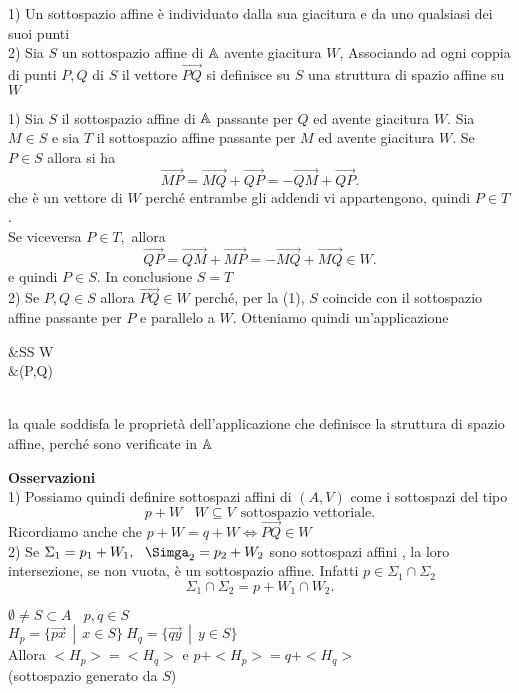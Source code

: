 \documentclass[12px]{article}
\begin{document}
	\newpage
	\begin{prop}
		1) Un sottospazio affine è individuato dalla sua giacitura e da uno qualsiasi dei suoi punti\\
		2) Sia $S$ un sottospazio affine di $\mathbb{A}$ avente giacitura $W$, Associando ad ogni coppia di punti $P,Q$ di $S$ il vettore $\overrightarrow{PQ}$ si definisce su $S$ una struttura di spazio affine su $W$
	\end{prop}
	\begin{dimo}
		1) Sia  $S$ il sottospazio affine di $\mathbb{A}$ passante per $Q$ ed avente giacitura $W$. Sia $M\in S$ e sia $T$ il sottospazio affine passante per $M$ ed avente giacitura $W$. Se $P\in S$ allora si ha
		\[
		 \overrightarrow{MP}=\overrightarrow{MQ}+\overrightarrow{QP} = - \overrightarrow{QM} + \overrightarrow{QP}
		.\] 
		che è un vettore di $W$ perché entrambe gli addendi vi appartengono, quindi $P\in T$.\\
		Se viceversa $P\in T,$ allora
		\[
		\overrightarrow{QP} = \overrightarrow{QM} + \overrightarrow{MP} = - \overrightarrow{MQ} + \overrightarrow{MQ}\in W
		.\] 
		e quindi $P\in S$. In conclusione $S=T$\\
		2) Se $ P,Q\in S$ allora $\overrightarrow{PQ}\in W$ perché, per la (1), $S$ coincide con il sottospazio affine passante per $P$ e parallelo a $W$. Otteniamo quindi un'applicazione\ \ \  \ 
		\begin{aligend}
			\text{   \ \ \ \ \  }&S\times S \rightarrow W\\
			\text{   \ \ \ \   }&(P,Q) \rightarrow {}
		\end{aligend}\\
		la quale soddisfa le proprietà dell'applicazione che definisce la struttura di spazio affine, perché sono verificate in $\mathbb{A}$
	\end{dimo}
	\textbf{Osservazioni}\\
	1) Possiamo quindi definire sottospazi affini di $(A,V)$ come i sottospazi del tipo \[
		p + W \ \ \ \ W\subseteq V \ \ \text{sottospazio vettoriale}
	.\] 
	Ricordiamo anche che $p + W = q + W \Leftrightarrow \overrightarrow{PQ}\in W$ \ \\[10px]2) Se $\Sigma_1 = p_1 + W_1, \ \ \Simga_2 = p_2 + W_2$ sono sottospazi affini , la loro intersezione, se non vuota, è un sottospazio affine. Infatti $p\in\Sigma_1\cap\Sigma_2$ 
	\[
	\Sigma_1\cap\Sigma_2=p + W_1\cap W_2
	.\] 
	\begin{lemm}
		$\emptyset\neq S\subset A \ \ \ \ p,q\in S$\\
		$H_p = \{\overrightarrow{px}\ \ |\ \ x\in S\} \ H_q =\{ \overrightarrow{qy}\ \ |\ \ y\in S\}$\\
		Allora $<H_p> = <H_q>$ e $p + <H_p> = q + <H_q>$ \\(sottospazio generato da $S$)
	\end{lemm}
\end{document}
